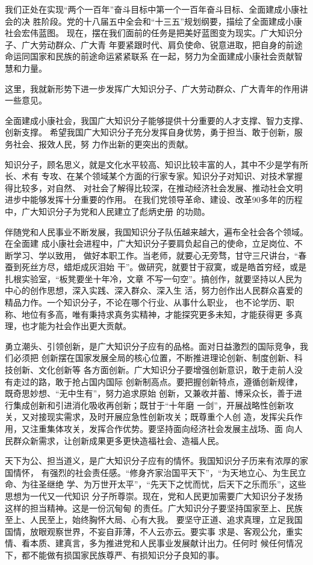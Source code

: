\documentclass[11pt]{ctexart}
\begin{document}
{{{{我们正处在实现“两个一百年”奋斗目标中第一个一百年奋斗目标、全面建成小康社会的决
胜阶段。党的十八届五中全会和“十三五”规划纲要，描绘了全面建成小康社会宏伟蓝图。
现在，摆在我们面前的任务是把美好蓝图变为现实。广大知识分子、广大劳动群众、广大青
年要紧跟时代、肩负使命、锐意进取，把自身的前途命运同国家和民族的前途命运紧紧联系
在一起，努力为全面建成小康社会贡献智慧和力量。

这里，我就新形势下进一步发挥广大知识分子、广大劳动群众、广大青年的作用讲一些意见。

全面建成小康社会，我国广大知识分子能够提供十分重要的人才支撑、智力支撑、创新支撑。
希望我国广大知识分子充分发挥自身优势，勇于担当、敢于创新，服务社会、报效人民，努
力作出新的更突出的贡献。

知识分子，顾名思义，就是文化水平较高、知识比较丰富的人，其中不少是学有所长、术有
专攻、在某个领域某个方面的行家专家。知识分子对知识、对技术掌握得比较多，对自然、
对社会了解得比较深，在推动经济社会发展、推动社会文明进步中能够发挥十分重要的作用。
在我们党领导革命、建设、改革90多年的历程中，广大知识分子为党和人民建立了彪炳史册
的功勋。

伴随党和人民事业不断发展，我国知识分子队伍越来越大，遍布全社会各个领域。在全面建
成小康社会进程中，广大知识分子要肩负起自己的使命，立足岗位、不断学习、学以致用，
做好本职工作。当老师，就要心无旁骛，甘守三尺讲台，“春蚕到死丝方尽，蜡炬成灰泪始
干”。做研究，就要甘于寂寞，或是皓首穷经，或是扎根实验室，“板凳要坐十年冷，文章
不写一句空”。搞创作，就要坚持以人民为中心的创作思想，深入实践、深入群众、深入生
活，努力创作出人民群众喜爱的精品力作。一个知识分子，不论在哪个行业、从事什么职业，
也不论学历、职称、地位有多高，唯有秉持求真务实精神，才能探究更多未知，才能获得更
多真理，也才能为社会作出更大贡献。

勇立潮头、引领创新，是广大知识分子应有的品格。面对日益激烈的国际竞争，我们必须把
创新摆在国家发展全局的核心位置，不断推进理论创新、制度创新、科技创新、文化创新等
各方面创新。广大知识分子要增强创新意识，敢于走前人没有走过的路，敢于抢占国内国际
创新制高点。要把握创新特点，遵循创新规律，既奇思妙想、“无中生有”，努力追求原始
创新，又兼收并蓄、博采众长，善于进行集成创新和引进消化吸收再创新；既甘于“十年磨
一剑”，开展战略性创新攻关，又对接现实需求，及时开展应急性创新攻关；既尊重个人创
造，发挥尖兵作用，又注重集体攻关，发挥合作优势。要坚持面向经济社会发展主战场、面
向人民群众新需求，让创新成果更多更快造福社会、造福人民。

天下为公、担当道义，是广大知识分子应有的情怀。我国知识分子历来有浓厚的家国情怀，
有强烈的社会责任感。“修身齐家治国平天下”，“为天地立心、为生民立命、为往圣继绝
学、为万世开太平”，“先天下之忧而忧，后天下之乐而乐”，这些思想为一代又一代知识
分子所尊崇。现在，党和人民更加需要广大知识分子发扬这样的担当精神。这是一份沉甸甸
的责任。广大知识分子要坚持国家至上、民族至上、人民至上，始终胸怀大局、心有大我。
要坚守正道、追求真理，立足我国国情，放眼观察世界，不妄自菲薄，不人云亦云。要实事
求是、客观公允，重实情、看本质、建真言，多为推进党和人民事业发展献计出力。任何时
候任何情况下，都不能做有损国家民族尊严、有损知识分子良知的事。

}}}}
\end{document}

